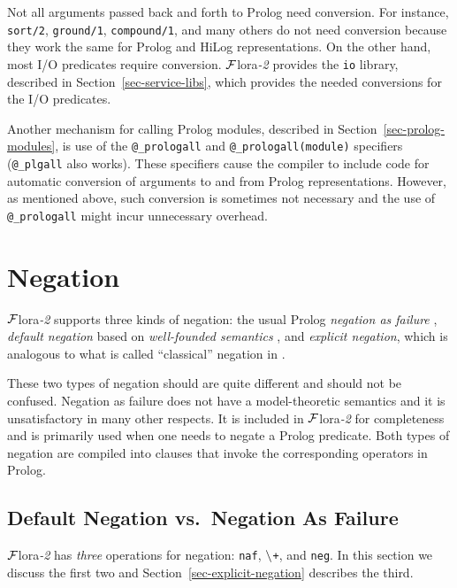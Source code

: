 \documentclass[11pt]{article}
\newcommand{\FLORA}{{\mbox{\sc ${\cal F}${lora}\rm\emph{-2}}}\xspace}
\newcommand{\PLGNAF}{\mbox{\tt \ensuremath{\tt\backslash}+}\xspace}
\newcommand{\SILKNAF}{{{\tt naf}}\xspace}
\begin{document}
Not all arguments passed back and forth to Prolog need conversion. For
instance, {\tt sort/2}, {\tt ground/1}, {\tt compound/1}, and many others
do not need conversion because they work the same for Prolog and HiLog
representations. On the other hand, most I/O predicates require conversion.
\FLORA provides the {\tt io} library, described in
Section~\ref{sec-service-libs}, which provides the needed conversions for
the I/O predicates.


Another mechanism for calling Prolog modules, described in
Section~\ref{sec-prolog-modules}, is use of the {\tt @\_prologall} and
{\tt @\_prologall(module)} specifiers ({\tt @\_plgall} also works). These
specifiers cause the compiler to include code for automatic conversion of
arguments to and from Prolog representations. However, as mentioned above,
such conversion is sometimes not necessary and the use of {\tt
  @\_prologall} might incur unnecessary overhead.



\section{Negation} \label{sec:negation}


\FLORA supports three kinds of negation: the usual Prolog \emph{negation as
  failure} \cite{Cla78}, \emph{default negation} based on
\emph{well-founded semantics}
\cite{gelder-alternating-89,gelder-ross-schlipf-91}, and \emph{explicit
  negation}, which is analogous to what is called ``classical'' negation in
\cite{gelfond91classical}.
 
These two types of negation should are quite different and should not be
confused. Negation as failure does not have a model-theoretic semantics
and it is unsatisfactory in many other respects. It is included in \FLORA
for completeness and is primarily used when one needs to negate a Prolog
predicate.
Both types of negation
are compiled into clauses that invoke the corresponding operators in
Prolog.

\subsection{Default Negation vs.~Negation As Failure}\label{sec-negation}
\index{\SILKNAF}
\index{\PLGNAF}
\FLORA has \emph{three} operations for negation: \SILKNAF, \PLGNAF, and {\tt neg}.
In this section we discuss the first two and
Section~\ref{sec-explicit-negation} describes the third.
\end{document}
